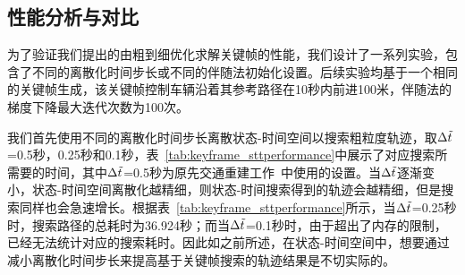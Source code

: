 \subsection{性能分析与对比}
\label{section:keyframe_performance}


为了验证我们提出的由粗到细优化求解关键帧的性能，我们设计了一系列实验，包含了不同的离散化时间步长或不同的伴随法初始化设置。后续实验均基于一个相同的关键帧生成，该关键帧控制车辆沿着其参考路径在10秒内前进100米，伴随法的梯度下降最大迭代次数为100次。

我们首先使用不同的离散化时间步长离散状态-时间空间以搜索粗粒度轨迹，取$\Delta{\Tilde{t}}$=0.5秒，0.25秒和0.1秒，表~\ref{tab:keyframe_sttperformance}中展示了对应搜索所需要的时间，其中$\Delta{\Tilde{t}}$=0.5秒为原先交通重建工作~\cite{sewall2010virtualized}中使用的设置。当$\Delta{\Tilde{t}}$逐渐变小，状态-时间空间离散化越精细，则状态-时间搜索得到的轨迹会越精细，但是搜索同样也会急速增长。根据表~\ref{tab:keyframe_sttperformance}所示，当$\Delta{\Tilde{t}}$=0.25秒时，搜索路径的总耗时为36.924秒；而当$\Delta{\Tilde{t}}$=0.1秒时，由于超出了内存的限制，已经无法统计对应的搜索耗时。因此如之前所述，在状态-时间空间中，想要通过减小离散化时间步长来提高基于关键帧搜索的轨迹结果是不切实际的。

